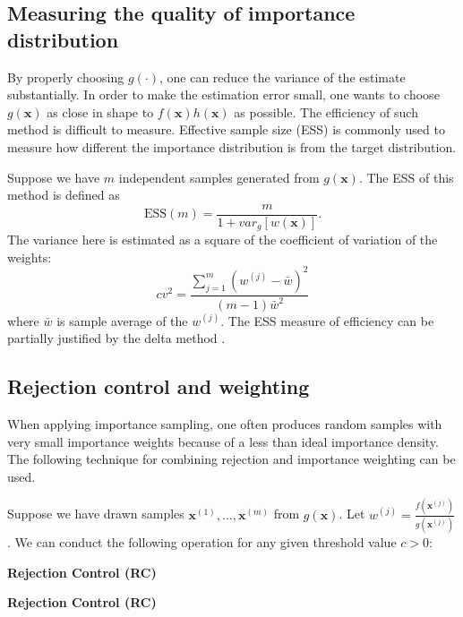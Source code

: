 \documentclass[times, utf8, diplomski]{fer}
\begin{document}
\subsection{Measuring the quality of importance distribution}
By properly choosing $g(\cdot)$, one can reduce the variance of the estimate substantially. In order to make the estimation error small, one wants to choose $g(\mathbf{x})$ as close in shape to $f(\mathbf{x})h(\mathbf{x})$ as possible. The efficiency of such method is difficult to measure. Effective sample size (ESS) is commonly used to measure how different the importance distribution is from the target  distribution. %

Suppose we have $m$ independent samples generated from $g(\mathbf{x})$. The ESS of this method is defined as 
\begin{equation}
\text{ESS}(m) = \frac{m}{1 + var_g[w(\mathbf{x})]}.
\end{equation}  
The variance here is estimated as a square of the coefficient of variation of the weights:
\begin{equation*}
cv^2 = \frac{\sum_{j=1}^{m} (w^{(j)} - \bar{w})^2}{(m - 1)\bar{w}^2}
\end{equation*}
where $\bar{w}$ is sample average of the $w^{(j)}$. The ESS measure of efficiency can be partially justified by the delta method \cite{Liu}. %

\subsection{Rejection control and weighting}
When applying importance sampling, one often produces random samples with very small importance weights because of a less than ideal importance density. The following technique for combining rejection and importance weighting can be used. 

Suppose we have drawn samples $\mathbf{x}^{(1)}, \ldots, \mathbf{x}^{(m)}$ from $g(\mathbf{x})$. Let $w^{(j)} =  \frac{f(\mathbf{x}^{(j)})}{g(\mathbf{x}^{(j)})}$. We can conduct the following operation for any given threshold value $c > 0$:
\vspace{5mm}

\begin{algorithm}[H]
\textbf{Rejection Control (RC)}\\
 \caption{\textbf{Rejection Control (RC)}}
 \label{RC}
\end{algorithm}
\vspace{5mm}
\end{document}
